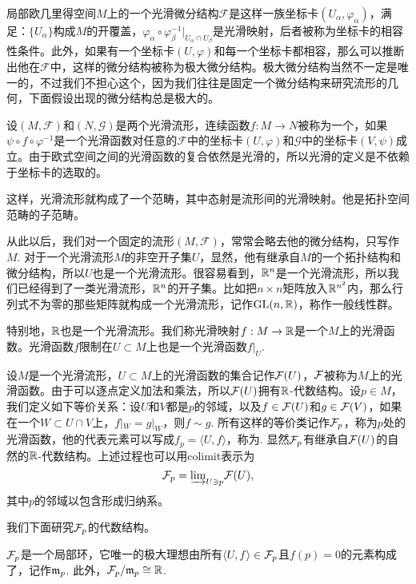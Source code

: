 \begin{para}
局部欧几里得空间$M$上的一个光滑微分结构$\mathscr{F}$是这样一族坐标卡$(U_\alpha,\varphi_\alpha)$，满足：$\{U_\alpha\}$构成$M$的开覆盖，$\varphi_\alpha\circ\varphi^{-1}_\beta|_{U_\alpha\cap U_\beta}$是光滑映射，后者被称为坐标卡的相容性条件。此外，如果有一个坐标卡$(U,\varphi)$和每一个坐标卡都相容，那么可以推断出他在$\mathscr{F}$中，这样的微分结构被称为极大微分结构。极大微分结构当然不一定是唯一的，不过我们不担心这个，因为我们往往是固定一个微分结构来研究流形的几何，下面假设出现的微分结构总是极大的。

设$(M,\mathscr{F})$和$(N,\mathscr{G})$是两个光滑流形，连续函数$f:M\to N$被称为一个，如果$\psi\circ f\circ \varphi^{-1}$是一个光滑函数对任意的$\mathscr{F}$中的坐标卡$(U,\varphi)$和$\mathscr{G}$中的坐标卡$(V,\psi)$成立。由于欧式空间之间的光滑函数的复合依然是光滑的，所以光滑的定义是不依赖于坐标卡的选取的。

这样，光滑流形就构成了一个范畴，其中态射是流形间的光滑映射。他是拓扑空间范畴的子范畴。
\end{para}

从此以后，我们对一个固定的流形$(M,\mathscr{F})$，常常会略去他的微分结构，只写作$M$. 对于一个光滑流形$M$的非空开子集$U$，显然，他有继承自$M$的一个拓扑结构和微分结构，所以$U$也是一个光滑流形。很容易看到，$\mathbb{R}^n$是一个光滑流形，所以我们已经得到了一类光滑流形，$\mathbb{R}^n$的开子集。比如把$n\times n$矩阵放入$\mathbb{R}^{n^2}$内，那么行列式不为零的那些矩阵就构成一个光滑流形，记作$\operatorname{GL}(n,\mathbb{R})$，称作一般线性群。

特别地，$\mathbb{R}$也是一个光滑流形。我们称光滑映射$f:M\to \mathbb{R}$是一个$M$上的光滑函数。光滑函数$f$限制在$U\subset M$上也是一个光滑函数$f|_U$.

\begin{para}[光滑函数芽]
设$M$是一个光滑流形，$U\subset M$上的光滑函数的集合记作$\mathcal{F}(U)$，$\mathcal{F}$被称为$M$上的光滑函数。由于可以逐点定义加法和乘法，所以$\mathcal{F}(U)$拥有$\mathbb{R}$-代数结构。设$p\in M$，我们定义如下等价关系：设$U$和$V$都是$p$的邻域，以及$f\in \mathcal{F}(U)$和$g\in \mathcal{F}(V)$，如果在一个$W\subset U\cap V$上，$f|_W=g|_W$，则$f\sim g$. 所有这样的等价类记作$\mathcal{F}_p$，称为$p$处的光滑函数，他的代表元素可以写成$f_p=\langle U,f\rangle$，称为. 显然$\mathcal{F}_p$有继承自$\mathcal{F}(U)$的自然的$\mathbb{R}$-代数结构。上述过程也可以用colimit表示为
\[
\mathcal{F}_p={\varinjlim}_{U\ni p}\mathcal{F}(U),
\]
其中$p$的邻域以包含形成归纳系。
\end{para}

我们下面研究$\mathcal{F}_p$的代数结构。

\begin{pro}
$\mathcal{F}_p$是一个局部环，它唯一的极大理想由所有$\langle U,f\rangle \in \mathcal{F}_p$且$f(p)= 0$的元素构成了，记作$\mathfrak{m}_p$. 此外，$\mathcal{F}_p/\mathfrak{m}_p\cong \mathbb{R}$.
\end{pro}

